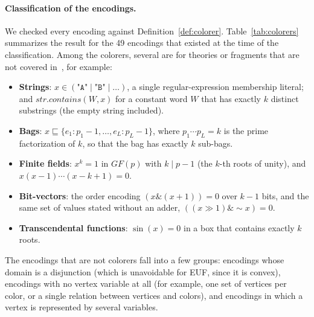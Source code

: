 \documentclass[12pt,a4paper]{article}
\theoremstyle{definition}
\begin{document}
\paragraph{Classification of the encodings.}
We checked every encoding against Definition~\ref{def:colorer}.
Table~\ref{tab:colorers} summarizes the result for the 49 encodings that existed at
the time of the classification. Among the colorers, several are for theories or
fragments that are not covered in~\cite{Sebastiani16}, for example:
\begin{itemize}
  \item \textbf{Strings}: $x \in (\texttt{"A"} \mid \texttt{"B"} \mid \dots)$, a
    single regular-expression membership literal; and
    $\mathit{str.contains}(W, x)$ for a constant word $W$ that has exactly $k$
    distinct substrings (the empty string included).
  \item \textbf{Bags}: $x \sqsubseteq \{e_1 : p_1 - 1, \dots, e_L : p_L - 1\}$, where
    $p_1 \cdots p_L = k$ is the prime factorization of $k$, so that the bag has
    exactly $k$ sub-bags.
  \item \textbf{Finite fields}: $x^k = 1$ in $GF(p)$ with $k \mid p - 1$ (the
    $k$-th roots of unity), and $x(x-1)\cdots(x-k+1) = 0$.
  \item \textbf{Bit-vectors}: the order encoding $(x \mathbin{\&} (x+1)) = 0$ over
    $k-1$ bits, and the same set of values stated without an adder,
    $((x \gg 1) \mathbin{\&} {\sim}x) = 0$.
  \item \textbf{Transcendental functions}: $\sin(x) = 0$ in a box that contains
    exactly $k$ roots.
\end{itemize}
The encodings that are not colorers fall into a few groups: encodings whose domain
is a disjunction (which is unavoidable for EUF, since it is convex), encodings with
no vertex variable at all (for example, one set of vertices per color, or a single
relation between vertices and colors), and encodings in which a vertex is
represented by several variables.
\end{document}
